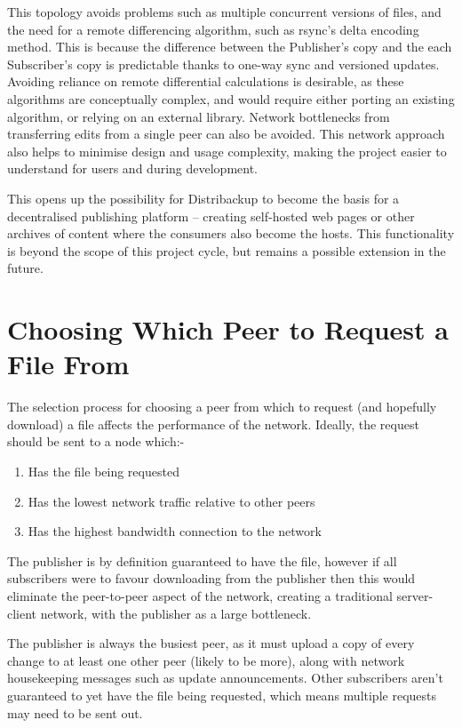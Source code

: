 \documentclass[12pt,a4paper,]{adreport}
\begin{document}
This topology avoids problems such as multiple concurrent versions of
files, and the need for a remote differencing algorithm, such as rsync's
delta encoding method. This is because the difference between the
Publisher's copy and the each Subscriber's copy is predictable thanks to
one-way sync and versioned updates. Avoiding reliance on remote
differential calculations is desirable, as these algorithms are
conceptually complex, and would require either porting an existing
algorithm, or relying on an external library. Network bottlenecks from
transferring edits from a single peer can also be avoided. This network
approach also helps to minimise design and usage complexity, making the
project easier to understand for users and during development.

This opens up the possibility for Distribackup to become the basis for a
decentralised publishing platform -- creating self-hosted web pages or
other archives of content where the consumers also become the hosts.
This functionality is beyond the scope of this project cycle, but
remains a possible extension in the future.

\section{Choosing Which Peer to Request a File
From}\label{choosing-which-peer-to-request-a-file-from}

The selection process for choosing a peer from which to request (and
hopefully download) a file affects the performance of the network.
Ideally, the request should be sent to a node which:-

\begin{enumerate}
\def\labelenumi{\arabic{enumi}.}
\itemsep1pt\parskip0pt
\item
  Has the file being requested
\item
  Has the lowest network traffic relative to other peers
\item
  Has the highest bandwidth connection to the network
\end{enumerate}

The publisher is by definition guaranteed to have the file, however if
all subscribers were to favour downloading from the publisher then this
would eliminate the peer-to-peer aspect of the network, creating a
traditional server-client network, with the publisher as a large
bottleneck.

The publisher is always the busiest peer, as it must upload a copy of
every change to at least one other peer (likely to be more), along with
network housekeeping messages such as update announcements. Other
subscribers aren't guaranteed to yet have the file being requested,
which means multiple requests may need to be sent out.
\end{document}
